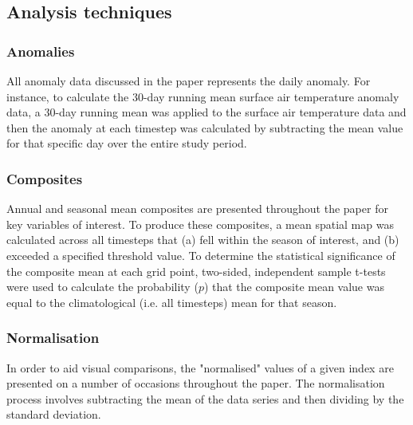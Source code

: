 \subsection{Analysis techniques}

\subsubsection{Anomalies}
All anomaly data discussed in the paper represents the daily anomaly. For instance, to calculate the 30-day running mean surface air temperature anomaly data, a 30-day running mean was applied to the surface air temperature data and then the anomaly at each timestep was calculated by subtracting the mean value for that specific day over the entire study period.

\subsubsection{Composites}
Annual and seasonal mean composites are presented throughout the paper for key variables of interest. To produce these composites, a mean spatial map was calculated across all timesteps that (a) fell within the season of interest, and (b) exceeded a specified threshold value. To determine the statistical significance of the composite mean at each grid point, two-sided, independent sample t-tests were used to calculate the probability ($p$) that the composite mean value was equal to the climatological (i.e. all timesteps) mean for that season.

\subsubsection{Normalisation}
In order to aid visual comparisons, the "normalised" values of a given index are presented on a number of occasions throughout the paper. The normalisation process involves subtracting the mean of the data series and then dividing by the standard deviation. 


